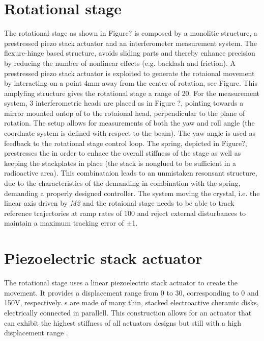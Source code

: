 \section{Rotational stage}
The rotational stage as shown in Figure? is composed by a monolitic structure, a prestressed piezo stack actuator and an interferometer measurement system. The flexure-hinge based structure, avoids sliding parts and thereby enhance precision by reducing the number of nonlinear effects (e.g. backlash and friction). A prestressed piezo stack actuator is exploited to generate the rotaional movement by interacting on a point 4mm away from the center of rotation, see Figure. This amplyfing structure gives the rotational stage a range of \unit{20}{\milli\rad}. For the measurement system, 3 interferometric heads are placed as in Figure ?, pointing towards a mirror mounted ontop of to the rotaional head, perpendicular to the plane of rotation. The setup allows for measurements of both the yaw and roll angle (the coordnate system is defined with respect to the beam). The yaw angle is used as feedback to the rotational stage control loop. The spring, depicted in Figure?, prestresses the \abbrPESA in order to enhace the overall stiffness of the stage as well as keeping the stackplates in place (the stack is nonglued to be sufficient in a radioactive area). This combinataion leads to an unmistaken resonsant structure, due to the characteristics of the \abbrPESA demanding in combination with the spring, demanding a properly designed controller. The system moving the crystal, i.e. the linear axis driven by \emph{M2} and the rotaional stage needs to be able to track reference trajectories at ramp rates of \unit{100}{\micro\radianpersecond} and reject external disturbances to maintain a maximum tracking error of $\pm$\unit{1}{\micro\rad}.

\section{Piezoelectric stack actuator}
The rotational stage uses a linear piezoelectric stack actuator to create the movement. It provides a displacement range from 0 to \unit{30}{\micro\meter}, corresponding to 0 and 150V, respectively. {\abbrPESA}s are made of many thin, stacked electroactive cheramic disks, electrically connected in parallell. This construction allows for an actuator that can exhibit the highest stiffness of all actuators designs but still with a high displacement range \cite{Piezo:2008}.

